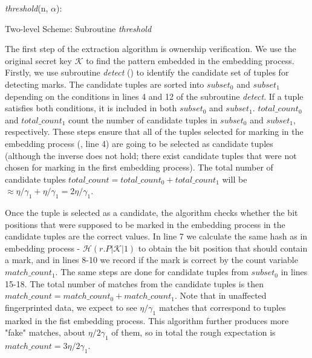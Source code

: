 \begin{algorithm}
    \textit{threshold}(n, $\alpha$):\\
    \caption{Two-level Scheme: Subroutine \textit{threshold}}
    \label{alg:subroutine-threshold}
\end{algorithm}

The first step of the extraction algorithm is ownership verification. 
We use the original secret key $\mathcal{K}$ to find the pattern embedded in the embedding process. 
Firstly, we use subroutine \textit{detect} () to identify the candidate set of tuples for detecting marks. 
The candidate tuples are sorted into $subset_0$ and $subset_1$ depending on the conditions in lines 4 and 12 of the subroutine \textit{detect}. 
If a tuple satisfies both conditions, it is included in both $subset_0$ and $subset_1$. 
$total\_count_0$ and $total\_count_1$ count the number of candidate tuples in $subset_0$ and $subset_1$, respectively. 
These steps ensure that all of the tuples selected for marking in the embedding process (, line 4) are going to be selected as candidate tuples (although the inverse does not hold; there exist candidate tuples that were not chosen for marking in the first embedding process). The total number of candidate tuples $total\_count=total\_count_0+total\_count_1$ will be $\approx\eta/\gamma_1 + \eta/\gamma_1=2\eta/\gamma_1$.

Once the tuple is selected as a candidate, the algorithm checks whether the bit positions that were supposed to be marked in the embedding process in the candidate tuples are the correct values. 
In line 7 we calculate the same hash as in embedding process - $\mathcal{H}(r.P|\mathcal{K}|1)$ to obtain the bit position that should contain a mark, and in lines 8-10 we record if the mark is correct by the count variable $match\_count_1$. 
The same steps are done for candidate tuples from $subset_0$ in lines 15-18. 
The total number of matches from the candidate tuples is then $match\_count=match\_count_0+match\_count_1$. 
Note that in unaffected fingerprinted data, we expect to see $\eta/\gamma_1$ matches that correspond to tuples marked in the fist embedding process. 
This algorithm further produces more "fake" matches, about $\eta/2\gamma_1$ of them, so in total the rough expectation is $match\_count = 3\eta/2\gamma_1$.

